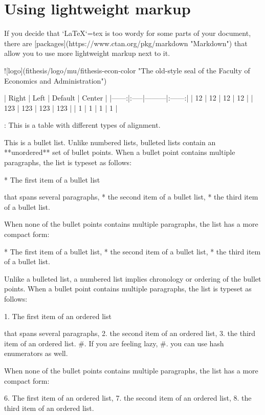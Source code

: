 \documentclass[
  digital,     %
  twoside,     %
  lof,         %
  lot,         %
]{fithesis4}
\begin{document}
\chapter{Using lightweight markup}
\begin{markdown}

If you decide that `\LaTeX`{=tex} is too wordy for some parts of your
document, there are [packages](https://www.ctan.org/pkg/markdown
"Markdown") that allow you to use more lightweight markup next
to it.

 ![logo](fithesis/logo/mu/fithesis-econ-color "The old-style seal
         of the Faculty of Economics and Administration")

| Right | Left | Default | Center |
|------:|:-----|---------|:------:|
|    12 | 12   | 12      |   12   |
|   123 | 123  | 123     |   123  |
|     1 | 1    | 1       |    1   |

: This is a table with different types of alignment.

This is a bullet list. Unlike numbered lists, bulleted lists
contain an **unordered** set of bullet points. When a bullet point
contains multiple paragraphs, the list is typeset as follows:

  * The first item of a bullet list

    that spans several paragraphs,
  * the second item of a bullet list,
  * the third item of a bullet list.

When none of the bullet points contains multiple paragraphs, the
list has a more compact form:

  * The first item of a bullet list,
  * the second item of a bullet list,
  * the third item of a bullet list.

Unlike a bulleted list, a numbered list implies chronology or
ordering of the bullet points. When a bullet point
contains multiple paragraphs, the list is typeset as follows:

  1. The first item of an ordered list

     that spans several paragraphs,
  2. the second item of an ordered list,
  3. the third item of an ordered list.
  #. If you are feeling lazy,
  #. you can use hash enumerators as well.

When none of the bullet points contains multiple paragraphs, the
list has a more compact form:

  6. The first item of an ordered list,
  7. the second item of an ordered list,
  8. the third item of an ordered list.


\end{markdown}
\end{document}
